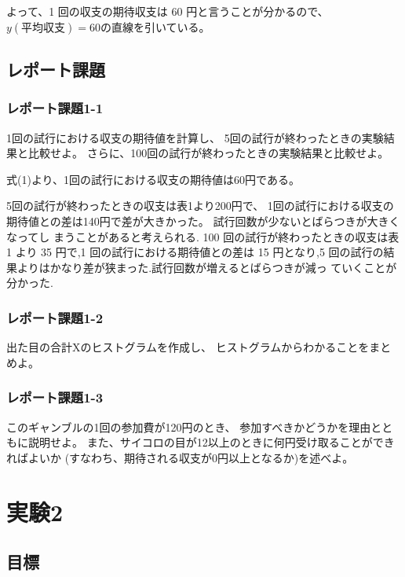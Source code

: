 \documentclass[12pt]{jarticle}
\begin{document}
よって、1 回の収支の期待収支は 60 円と言うことが分かるので、$y(平均収支)=60$の直線を引いている。

\subsection{レポート課題}
\subsubsection*{レポート課題1-1}
\begin{shadebox}
    1回の試行における収支の期待値を計算し、
    5回の試行が終わったときの実験結果と比較せよ。
    さらに、100回の試行が終わったときの実験結果と比較せよ。
\end{shadebox}
式(1)より、1回の試行における収支の期待値は60円である。

5回の試行が終わったときの収支は表1より200円で、
1回の試行における収支の期待値との差は140円で差が大きかった。
試行回数が少ないとばらつきが大きくなってし
まうことがあると考えられる.
100 回の試行が終わったときの収支は表 1 より 35 円で,1 回の試行における期待値との差は
15 円となり,5 回の試行の結果よりはかなり差が狭まった.試行回数が増えるとばらつきが減っ
ていくことが分かった.

\subsubsection*{レポート課題1-2}
\begin{shadebox}
    出た目の合計Xのヒストグラムを作成し、
    ヒストグラムからわかることをまとめよ。
\end{shadebox}

\subsubsection*{レポート課題1-3}
\begin{shadebox}
    このギャンブルの1回の参加費が120円のとき、
    参加すべきかどうかを理由とともに説明せよ。
    また、サイコロの目が12以上のときに何円受け取ることができればよいか
    (すなわち、期待される収支が0円以上となるか)を述べよ。
\end{shadebox}

\section{実験2}

\subsection{目標}
\end{document}
